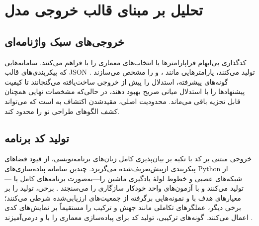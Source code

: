 
\section{تحلیل بر مبنای قالب خروجی مدل}

\subsection{خروجی‌های سبک واژنامه‌ای}

 کدگذاری بی‌ابهام فراپارامترها یا انتخاب‌های معماری را با  فراهم می‌کنند. سامانه‌هایی که پیکربندی‌های قالب JSON تولید می‌کنند، پارامترهایی مانند ،  و  را مشخص می‌سازند \cite{zhang2023usingLLMforHPO, liu2025agenthpo}. گونه‌های پیشرفته، استدلال  را پیش از خروجی ساخت‌یافته می‌گنجانند تا کیفیت پیشنهادها را با استدلال میانی صریح بهبود دهند، در حالی‌که مشخصات نهایی همچنان قابل تجزیه باقی می‌ماند. محدودیت اصلی، مقیدشدن اکتشاف به  است که می‌تواند کشف الگوهای طراحی نو را محدود کند.

\subsection{تولید کد برنامه}

خروجی مبتنی بر کد با تکیه بر بیان‌پذیری کامل زبان‌های برنامه‌نویسی، از قیود فضاهای پیکربندی ازپیش‌تعریف‌شده می‌گریزد. چندین سامانه پیاده‌سازی‌های Python از شبکه‌های عصبی و خطوط لولهٔ یادگیری ماشین را—به‌صورت برنامه‌های کامل یا —تولید می‌کنند و با آزمون‌های واحد خودکار سازگاری را می‌سنجند \cite{xu2024largeTextToML, LLMatic2024, chen2023Evoprompting}. برخی، تولید را بر معیارهای هدف با  و نمونه‌هایی برگرفته از جمعیت‌های ارزیابی‌شده شرطی می‌کنند؛ برخی دیگر، عملگرهای تکاملی مانند جهش و ترکیب را مستقیماً بر نمایش‌های کدی اعمال می‌کنند. گونه‌های ترکیبی، تولید کد برای پیاده‌سازی معماری را با  و  درمی‌آمیزند \cite{zhang2023AutomlGPTAutomaticMachineLearning, trirat2025automlagent}.

